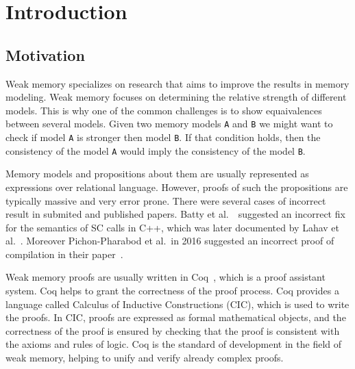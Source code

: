 \section{Introduction}

\subsection{Motivation}
Weak memory specializes on research that aims to improve the results in memory modeling. Weak memory focuses on determining the relative strength of different models. This is why one of the common challenges is to show equaivalences between several models. Given two memory models \texttt{A} and \texttt{B} we might want to check if model \texttt{A} is stronger then model \texttt{B}. If that condition holds, then the consistency of the model \texttt{A} would imply the consistency of the model \texttt{B}.

Memory models and propositions about them are usually represented as expressions over relational language. However, proofs of such the propositions are typically massive and very error prone. There were several cases of incorrect result in submited and published papers. Batty et al.~\cite{batty_2016}\ suggested an incorrect fix for the semantics of SC calls in C++, which was later documented by Lahav et al.~\cite{lahav2017repairing}. Moreover Pichon-Pharabod et al.\  in 2016 suggested an incorrect proof of compilation in their paper~\cite{PichonPharabod_Sewell16}. 

Weak memory proofs are usually written in Coq~\cite{bertot2013interactive}, which is a proof assistant system. Coq helps to grant the correctness of the proof process. Coq provides a language called Calculus of Inductive Constructions (CIC), which is used to write the proofs. In CIC, proofs are expressed as formal mathematical objects, and the correctness of the proof is ensured by checking that the proof is consistent with the axioms and rules of logic. Coq is the standard of development in the field of weak memory, helping to unify and verify already complex proofs. 

